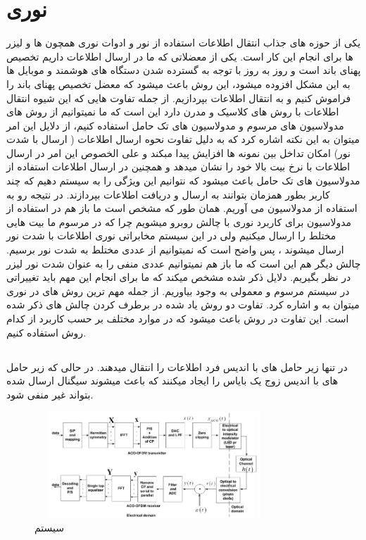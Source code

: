\documentclass{article}
\begin{document}
\section{ نوری}

یکی از حوزه های جذاب انتقال اطلاعات استفاده از نور و ادوات نوری همچون ها و لیزر ها برای انجام این کار است. یکی از معضلاتی که ما در ارسال اطلاعات داریم تخصیص پهنای باند است و روز به روز با توجه به گسترده شدن دستگاه های هوشمند و  موبایل ها به این مشکل افزوده میشود، این روش باعث میشود که معضل تخصیص پهنای باند را فراموش کنیم و به انتقال اطلاعات بپردازیم. از جمله تفاوت هایی که این شیوه انتقال اطلاعات با روش های کلاسیک و مدرن دارد این است که ما نمیتوانیم از روش های مدولاسیون های مرسوم و مدولاسیون های تک حامل استفاده کنیم، از دلایل این امر میتوان به این نکته اشاره کرد که به دلیل تفاوت نحوه ارسال اطلاعات ( ارسال با شدت نور) امکان تداخل بین نمونه ها افزایش پیدا مبکند و علی الخصوص این امر در ارسال اطلاعات با نرخ بیت بالا خود را نشان میدهد و همچنین در ارسال اطلاعات استفاده از مدولاسیون های تک حامل باعث میشود که نتوانیم این ویژگی را به سیستم دهیم که چند کاربر بطور همزمان بتوانند به ارسال و دریافت اطلاعات بپردازند. در نتیجه رو به استفاده از مدولاسیون  می آوریم.
همان طور که مشخص است ما باز هم در استفاده از مدولاسیون  برای کاربرد نوری  با چالش روبرو میشویم چرا که در  مرسوم ما بیت هایی مختلط را ارسال میکنیم ولی در این سیستم مخابراتی نوری اطلاعات با شدت نور ارسال میشوند ، پس واضح است که نمیتوانیم از عددی مختلط به شدت نور برسیم. چالش دیگر هم این است که ما باز هم نمیتوانیم عددی منفی را به عنوان شدت نور لیزر در نظر بگیریم. دلایل ذکر شده مشخص میکند که ما برای انجام این مهم باید تغییراتی در سیستم  مرسوم و معمولی به وجود بیاوریم. 
از جمله مهم ترین روش های در  نوری میتوان به   و  اشاره کرد. تفاوت دو روش یاد شده در برطرف کردن چالش های ذکر شده است. این تفاوت در روش باعث میشود که در موارد مختلف بر حسب کاربرد از کدام روش استفاده کنیم.

\subsection{}


در        
تنها زیر حامل های با اندیس فرد اطلاعات را انتقال میدهند. در حالی که زیر حامل های با اندیس زوج یک بایاس را ایجاد میکنند که باعث میشوند  سیگنال  ارسال شده بتواند غیر منفی شود.\cite{2}
\begin{figure}[h!]
\begin{center}
\includegraphics[width=9cm, height=4cm]{aco.PNG}
\end{center}
\caption{  سیستم }
\label{acomodel}

\end{figure}
\ \newpage
\end{document}
